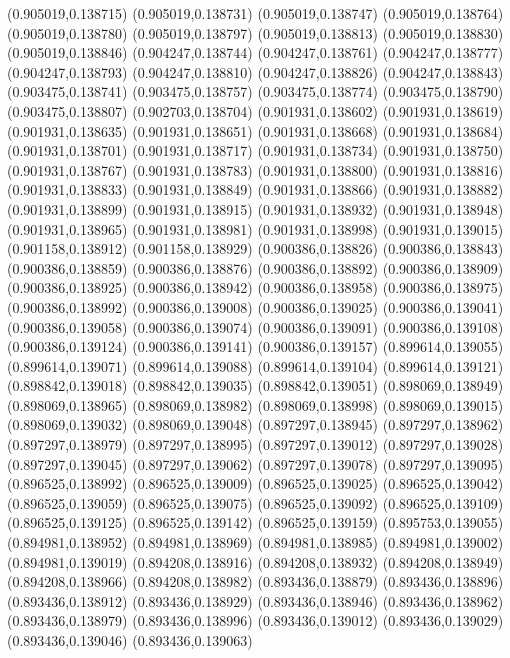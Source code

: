 (0.905019,0.138715)
(0.905019,0.138731)
(0.905019,0.138747)
(0.905019,0.138764)
(0.905019,0.138780)
(0.905019,0.138797)
(0.905019,0.138813)
(0.905019,0.138830)
(0.905019,0.138846)
(0.904247,0.138744)
(0.904247,0.138761)
(0.904247,0.138777)
(0.904247,0.138793)
(0.904247,0.138810)
(0.904247,0.138826)
(0.904247,0.138843)
(0.903475,0.138741)
(0.903475,0.138757)
(0.903475,0.138774)
(0.903475,0.138790)
(0.903475,0.138807)
(0.902703,0.138704)
(0.901931,0.138602)
(0.901931,0.138619)
(0.901931,0.138635)
(0.901931,0.138651)
(0.901931,0.138668)
(0.901931,0.138684)
(0.901931,0.138701)
(0.901931,0.138717)
(0.901931,0.138734)
(0.901931,0.138750)
(0.901931,0.138767)
(0.901931,0.138783)
(0.901931,0.138800)
(0.901931,0.138816)
(0.901931,0.138833)
(0.901931,0.138849)
(0.901931,0.138866)
(0.901931,0.138882)
(0.901931,0.138899)
(0.901931,0.138915)
(0.901931,0.138932)
(0.901931,0.138948)
(0.901931,0.138965)
(0.901931,0.138981)
(0.901931,0.138998)
(0.901931,0.139015)
(0.901158,0.138912)
(0.901158,0.138929)
(0.900386,0.138826)
(0.900386,0.138843)
(0.900386,0.138859)
(0.900386,0.138876)
(0.900386,0.138892)
(0.900386,0.138909)
(0.900386,0.138925)
(0.900386,0.138942)
(0.900386,0.138958)
(0.900386,0.138975)
(0.900386,0.138992)
(0.900386,0.139008)
(0.900386,0.139025)
(0.900386,0.139041)
(0.900386,0.139058)
(0.900386,0.139074)
(0.900386,0.139091)
(0.900386,0.139108)
(0.900386,0.139124)
(0.900386,0.139141)
(0.900386,0.139157)
(0.899614,0.139055)
(0.899614,0.139071)
(0.899614,0.139088)
(0.899614,0.139104)
(0.899614,0.139121)
(0.898842,0.139018)
(0.898842,0.139035)
(0.898842,0.139051)
(0.898069,0.138949)
(0.898069,0.138965)
(0.898069,0.138982)
(0.898069,0.138998)
(0.898069,0.139015)
(0.898069,0.139032)
(0.898069,0.139048)
(0.897297,0.138945)
(0.897297,0.138962)
(0.897297,0.138979)
(0.897297,0.138995)
(0.897297,0.139012)
(0.897297,0.139028)
(0.897297,0.139045)
(0.897297,0.139062)
(0.897297,0.139078)
(0.897297,0.139095)
(0.896525,0.138992)
(0.896525,0.139009)
(0.896525,0.139025)
(0.896525,0.139042)
(0.896525,0.139059)
(0.896525,0.139075)
(0.896525,0.139092)
(0.896525,0.139109)
(0.896525,0.139125)
(0.896525,0.139142)
(0.896525,0.139159)
(0.895753,0.139055)
(0.894981,0.138952)
(0.894981,0.138969)
(0.894981,0.138985)
(0.894981,0.139002)
(0.894981,0.139019)
(0.894208,0.138916)
(0.894208,0.138932)
(0.894208,0.138949)
(0.894208,0.138966)
(0.894208,0.138982)
(0.893436,0.138879)
(0.893436,0.138896)
(0.893436,0.138912)
(0.893436,0.138929)
(0.893436,0.138946)
(0.893436,0.138962)
(0.893436,0.138979)
(0.893436,0.138996)
(0.893436,0.139012)
(0.893436,0.139029)
(0.893436,0.139046)
(0.893436,0.139063)
